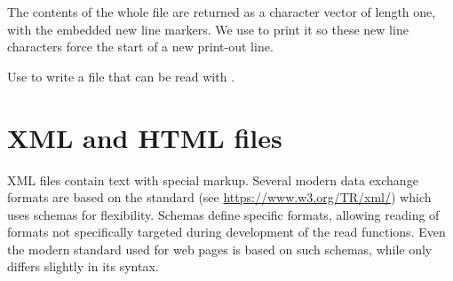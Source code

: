 \documentclass[krantz2]{krantz}\usepackage{knitr}
\begin{document}
The contents of the whole file are returned as a character vector of length one, with the embedded new line markers. We use  to print it so these new line characters force the start of a new print-out line.

\begin{knitrout}\footnotesize
{}\color{fgcolor}\begin{kframe}
\begin{alltt}
 \hlkwb{<-} \hlstd{(} \hlstd{=} \hlstd{)}
\end{alltt}


{\ttfamily\noindent\bfseries\color{errorcolor}{\#\# Error: 'extdata/miss-aligned-ASCII.txt' does not exist in current working directory ('C:/Users/Aphalo/Documents/Own\_manuscripts/Books/learnr-book').}}\begin{alltt}
\end{alltt}


{\ttfamily\noindent\bfseries\color{errorcolor}{\#\# Error in eval(expr, envir, enclos): object 'one.str' not found}}\begin{alltt}
\end{alltt}


{\ttfamily\noindent\bfseries\color{errorcolor}{\#\# Error in cat(one.str): object 'one.str' not found}}\end{kframe}
\end{knitrout}

\begin{advplayground}
Use  to write a file that can be read with .
\end{advplayground}

\section{XML and HTML files}

XML files contain text with special markup. Several modern data exchange formats are based on the  standard (see \url{https://www.w3.org/TR/xml/}) which uses schemas for flexibility. Schemas define specific formats, allowing reading of formats not specifically targeted during development of the read functions. Even the modern  standard used for web pages is based on such schemas, while  only differs slightly in its syntax.
\end{document}
